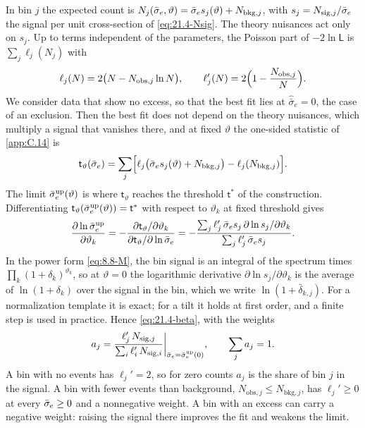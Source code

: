 In bin $j$ the expected count is $N_j(\bar{\sigma}_{e},\vartheta) = \bar{\sigma}_{e} s_j(\vartheta) + N_{\mathrm{bkg},j}$, with $s_j = N_{\mathrm{sig},j}/\bar{\sigma}_{e}$ the signal per unit cross-section of \cref{eq:21.4-Nsig}. The theory nuisances act only on $s_j$. Up to terms independent of the parameters, the Poisson part of $-2\ln\mathsf{L}$ is $\sum_j\ell_j(N_j)$ with
\begin{equation*}
  \ell_j(N) = 2\bigl(N - N_{\mathrm{obs},j}\ln N\bigr) , \qquad \ell_j'(N) = 2\Bigl(1 - \frac{N_{\mathrm{obs},j}}{N}\Bigr) .
\end{equation*}
We consider data that show no excess, so that the best fit lies at $\hat{\bar\sigma}_e = 0$, the case of an exclusion. Then the best fit does not depend on the theory nuisances, which multiply a signal that vanishes there, and at fixed $\vartheta$ the one-sided statistic of \cref{app:C.14} is
\begin{equation}
  \mathsf{t}_\vartheta(\bar{\sigma}_{e}) = \sum_j\Bigl[\ell_j\bigl(\bar{\sigma}_{e} s_j(\vartheta) + N_{\mathrm{bkg},j}\bigr) - \ell_j(N_{\mathrm{bkg},j})\Bigr] .
  \label{eq:D.47-tfix}
\end{equation}
The limit $\bar{\sigma}_{e}^{\mathrm{up}}(\vartheta)$ is where $\mathsf{t}_\vartheta$ reaches the threshold $\mathsf{t}^*$ of the construction. Differentiating $\mathsf{t}_\vartheta(\bar{\sigma}_{e}^{\mathrm{up}}(\vartheta)) = \mathsf{t}^*$ with respect to $\vartheta_k$ at fixed threshold gives
\begin{equation*}
  \frac{\partial\ln\bar{\sigma}_{e}^{\mathrm{up}}}{\partial\vartheta_k} = -\frac{\partial\mathsf{t}_\vartheta/\partial\vartheta_k}{\partial\mathsf{t}_\vartheta/\partial\ln\bar{\sigma}_{e}}
  = -\frac{\sum_j\ell_j'\,\bar{\sigma}_{e} s_j\,\partial\ln s_j/\partial\vartheta_k}{\sum_j\ell_j'\,\bar{\sigma}_{e} s_j} .
\end{equation*}
In the power form \cref{eq:8.8-M}, the bin signal is an integral of the spectrum times $\prod_k(1 + \delta_k)^{\vartheta_k}$, so at $\vartheta = 0$ the logarithmic derivative $\partial\ln s_j/\partial\vartheta_k$ is the average of $\ln(1 + \delta_k)$ over the signal in the bin, which we write $\ln(1 + \bar\delta_{k,j})$. For a normalization template it is exact; for a tilt it holds at first order, and a finite step is used in practice. Hence \cref{eq:21.4-beta}, with the weights
\begin{equation}
  a_j = \frac{\ell_j'\,N_{\mathrm{sig},j}}{\sum_i\ell_i'\,N_{\mathrm{sig},i}}\bigg|_{\bar{\sigma}_{e} = \bar{\sigma}_{e}^{\mathrm{up}}(0)} , \qquad \sum_ja_j = 1 .
  \label{eq:D.47-weights}
\end{equation}
A bin with no events has $\ell_j' = 2$, so for zero counts $a_j$ is the share of bin $j$ in the signal. A bin with fewer events than background, $N_{\mathrm{obs},j} \le N_{\mathrm{bkg},j}$, has $\ell_j' \ge 0$ at every $\bar{\sigma}_{e} \ge 0$ and a nonnegative weight. A bin with an excess can carry a negative weight: raising the signal there improves the fit and weakens the limit.

